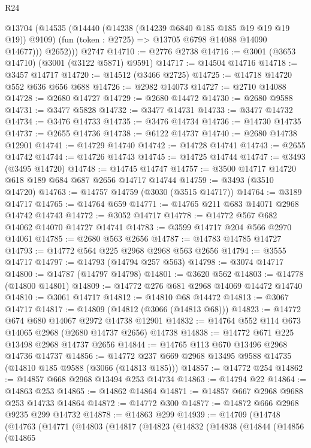 \begin{lexlean}{R24}
\begin{coremodule}
        @13704
          (@14535
            (@14440 (@14238 (@14239 @6840 @185 @185 @19 @19 @19 @19)) @9109)
            (fun (token : @2725) => @13705 @6798 @14088 @14090 @14677)))
          @2652)))
    @2747
@14710 := @2776 @2738
@14716 := @3001 (@3653 @14710) (@3001 (@3122 @5871) @9591)
@14717 := @14504 @14716
@14718 := @3457 @14717
@14720 := @14512 (@3466 @2725)
@14725 := @14718 @14720 @552 @636 @656 @688
@14726 := @2982 @14073
@14727 := @2710 @14088
@14728 := @2680 @14727
@14729 := @2680 @14472
@14730 := @2680 @9588
@14731 := @3477 @5828
@14732 := @3477 @14731
@14733 := @3477 @14732
@14734 := @3476 @14733
@14735 := @3476 @14734
@14736 := @14730 @14735
@14737 := @2655 @14736
@14738 := @6122 @14737
@14740 := @2680 @14738 @12901
@14741 := @14729 @14740
@14742 := @14728 @14741
@14743 := @2655 @14742
@14744 := @14726 @14743
@14745 := @14725 @14744
@14747 := @3493 (@3495 @14720)
@14748 := @14745 @14747
@14757 := @3500 @14717 @14720 @618 @189 @684 @687 @2656 @14717 @14744
@14759 := @3493 (@3510 @14720)
@14763 := @14757 @14759 (@3030 (@3515 @14717))
@14764 := @3189 @14717
@14765 := @14764 @659
@14771 := @14765 @211 @683 @14071 @2968 @14742 @14743
@14772 := @3052 @14717
@14778 := @14772 @567 @682 @14062 @14070 @14727 @14741
@14783 := @3599 @14717 @204 @566 @2970 @14061
@14785 := @2680 @563 @2656
@14787 := @14783 @14785 @14727
@14793 := @14772 @564 @225 @2968 @2968 @563 @2656
@14794 := @3555 @14717
@14797 := @14793 (@14794 @257 @563)
@14798 := @3074 @14717
@14800 := @14787 (@14797 @14798)
@14801 := @3620 @562
@14803 := @14778 (@14800 @14801)
@14809 := @14772 @276 @681 @2968 @14069 @14472 @14740
@14810 := @3061 @14717
@14812 := @14810 @68 @14472
@14813 := @3067 @14717
@14817 := @14809 (@14812 (@3066 (@14813 @68)))
@14823 := @14772 @674 @680 @14067 @2972 @14738 @12901
@14832 := @14764 @552 @114 @673 @14065 @2968 (@2680 @14737 @2656) @14738
@14838 := @14772 @671 @225 @13498 @2968 @14737 @2656
@14844 := @14765 @113 @670 @13496 @2968 @14736 @14737
@14856 := @14772 @237 @669 @2968 @13495 @9588 @14735 (@14810 @185 @9588 (@3066 (@14813 @185)))
@14857 := @14772 @254
@14862 := @14857 @668 @2968 @13494 @253 @14734
@14863 := @14794 @22
@14864 := @14863 @253
@14865 := @14862 @14864
@14871 := @14857 @667 @2968 @9688 @253 @14733 @14864
@14872 := @14772 @300
@14877 := @14872 @666 @2968 @9235 @299 @14732
@14878 := @14863 @299
@14939 := @14709
    (@14748
      (@14763
        (@14771
          (@14803
            (@14817
              (@14823
                (@14832
                  (@14838
                    (@14844
                      (@14856
                        (@14865

\end{coremodule}
\end{lexlean}

